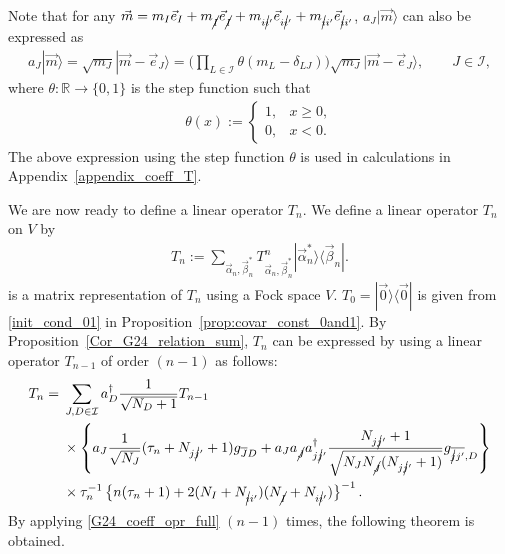 \documentclass[pdftex]{sigma}
\numberwithin{equation}{section}
\begin{document}
Note that for any
$
\vec{m}
=
m_{I}
\vec{e}_{I}
+
m_{\cancel{I}}
\vec{e}_{\cancel{I}}
+
m_{i\cancel{i}'}
\vec{e}_{i\cancel{i}'}
+
m_{\cancel{i}i'}
\vec{e}_{\cancel{i}i'}
$,
$
a_{J}
|
\vec{m}
\rangle
$
can also be expressed as
\begin{align}
a_{J}
|
\vec{m}
\rangle
=
\sqrt{m_{J}}
|
\vec{m}
-
\vec{e}_{J}
\rangle
=
 \bigg(
\prod_{
L
\in
\mathcal{I}
}
\theta
(
m_{L}
-
\delta_{LJ}
)
 \bigg)
\sqrt{m_{J}}
|
\vec{m}
-
\vec{e}_{J}
\rangle
,\qquad
J\in\mathcal{I},\label{braket_ann_step_fct}
\end{align}
where
$
\theta
\colon
\mathbb{R}
\to
\{
0,1
\}
$
is the step function such that
\begin{align*}
\theta(x)
:=
\begin{cases}
1,
&
x\geq0,
\\
0,
&
x<0.
\end{cases}
\end{align*}
The above expression using the step function $\theta$ is used in calculations in Appendix~\ref{appendix_coeff_T}.

We are now ready to define a linear operator $T_{n}$. We define a linear operator $T_{n}$ on $V$ by
\begin{align}
T_{n}
:=
\sum_{\vec{\alpha}_{n},\vec{\beta}_{n}^{\ast}}
T^{n}_{\vec{\alpha}_{n},\vec{\beta}_{n}^{\ast}}
|
\vec{\alpha}_{n}^{\ast}
\rangle
\langle
\vec{\beta}_{n}|.\label{braket_coeff}
\end{align}
 is a matrix representation of $T_{n}$ using a Fock space $V$.
$
T_{0}
=
|
\vec{0}
\rangle
\langle
\vec{0}
|
$
is given from \eqref{init_cond_01} in Proposition~\ref{prop:covar_const_0and1}.
By Proposition~\ref{Cor_G24_relation_sum}, $T_{n}$ can be expressed by using a linear operator $T_{n-1}$ of order $(n-1)$ as follows:
\begin{align}
 T_{n}
 ={}&
 \sum_{
 J,D
 \in
 \mathcal{I}
 }
 a_{D}^{\dagger}
 \frac{1}{
 \sqrt{
 N_{D}
 +
 1
 }
 }
 T_{n-1}\nonumber\\
 &\times
 \left\{
 a_{J}
 \frac{1}{\sqrt{N_{J}}}
 (
 \tau_{n}
 +
 N_{j\cancel{j}'}
 +
 1
 )
 g_{\overline{J}D}
 +
 a_{J}
 a_{\cancel{J}}
 a_{j\cancel{j}'}^{\dagger}
 \frac{N_{j\cancel{j}'}+1}{
 \sqrt{
 N_{J}
 N_{\cancel{J}}
 (
 N_{j\cancel{j}'}+1
 )
 }
 }
 g_{\overline{\cancel{j}j'},D}
 \right\}
 \nonumber
 \\
 &
 \times
 \tau_{n}^{-1}
 \left\{
 n
 (
 \tau_{n}
 +
 1
 )
 +
 2
 (
 N_{I}
 +
 N_{\cancel{i}i'}
 )
 (
 N_{\cancel{I}}
 +
 N_{i\cancel{i}'}
 )
 \right\}^{-1}. \label{G24_coeff_opr_full}
\end{align}
By applying \eqref{G24_coeff_opr_full} $(n-1)$ times,
the following theorem is obtained.
\end{document}
